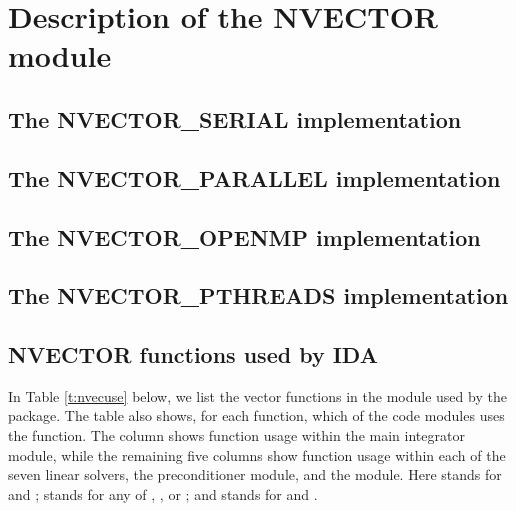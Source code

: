 \chapter{Description of the NVECTOR module}\label{s:nvector}


\section{The NVECTOR\_SERIAL implementation}\label{ss:nvec_ser}


\section{The NVECTOR\_PARALLEL implementation}\label{ss:nvec_par}


\section{The NVECTOR\_OPENMP implementation}\label{ss:nvec_openmp}


\section{The NVECTOR\_PTHREADS implementation}\label{ss:nvec_pthreads}


\section{NVECTOR functions used by IDA}

In Table \ref{t:nvecuse} below, we list the vector functions in the 
{\nvector} module used by the {\ida} package.
The table also shows, for each function, which of the code modules uses
the function. The {\ida} column shows function usage within the main
integrator module, while the remaining five columns show function usage
within each of the seven {\ida} linear solvers, the {\idabbdpre}
preconditioner module, and the {\fida} module.
Here {\idadls} stands for {\idadense} and {\idaband}; {\idaspils} stands
for any of {\idaspgmr}, {\idaspbcg}, or {\idasptfqmr}; and {\idasparse}
stands for {\idaklu} and {\idasuperlumt}.

